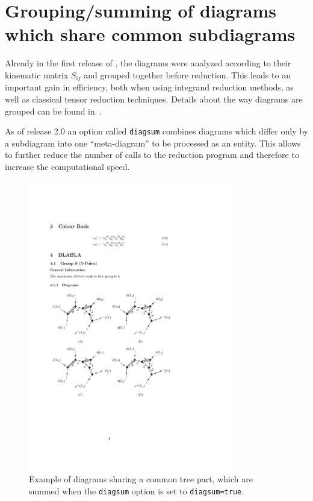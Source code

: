 \section{Grouping/summing of diagrams which share common subdiagrams}
\label{sec:grouping_summing}
Already in the first release of \gosam{}, the diagrams were analyzed
according to their kinematic matrix $S_{ij}$ and grouped together
before reduction. This leads to an important gain in efficiency, both
when using integrand reduction methods, as well as 
classical tensor reduction techniques. Details about the way diagrams
are grouped can be found in~\cite{Cullen:2011ac}.

As of release 2.0 an option called \texttt{diagsum} combines diagrams
which differ only by a subdiagram into one ``meta-diagram'' to be
processed as an entity. This allows to further reduce the number of
calls to the reduction program and therefore to increase the
computational speed. 

\begin{figure}[htb]
\centering
\includegraphics[width=0.8\textwidth]{figures/diagsum1.pdf}
\caption{Example of diagrams sharing a common tree part, which are 
summed when the \texttt{diagsum} option is set to \texttt{diagsum=true}.}
\label{fig:diagsum_tree}
\end{figure} 


